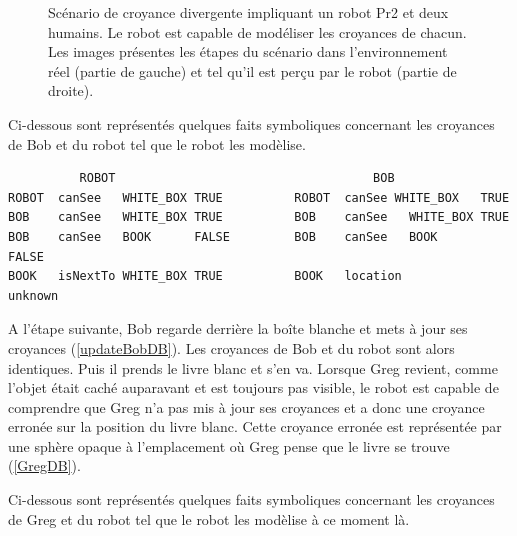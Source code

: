 \documentclass[a4paper,11pt,twoside]{StyleThese}
\begin{document}
\begin{figure}[ht!]
\begin{center}
 \end{center}
  \caption{Scénario de croyance divergente impliquant un robot Pr2 et deux humains. Le robot est capable de modéliser les croyances de chacun. Les images présentes les étapes du scénario dans l'environnement réel (partie de gauche) et tel qu'il est perçu par le robot (partie de droite).}
  \label{divB}
\end{figure}

Ci-dessous sont représentés quelques faits symboliques concernant les croyances de Bob et du robot tel que le robot les modèlise.

\begin{scriptsize}
\begin{verbatim}
          ROBOT                                    BOB
ROBOT  canSee   WHITE_BOX TRUE          ROBOT  canSee WHITE_BOX   TRUE    
BOB    canSee   WHITE_BOX TRUE          BOB    canSee   WHITE_BOX TRUE
BOB    canSee   BOOK      FALSE         BOB    canSee   BOOK      FALSE
BOOK   isNextTo WHITE_BOX TRUE          BOOK   location           unknown
\end{verbatim}
\end{scriptsize}

A l'étape suivante, Bob regarde derrière la boîte blanche et mets à jour ses croyances (\ref{updateBobDB}). Les croyances de Bob et du robot sont alors identiques.
Puis il prends le livre blanc et s'en va. Lorsque Greg revient, comme l'objet était caché auparavant et est toujours pas visible, le robot est capable de comprendre que Greg n'a pas mis à jour ses croyances et a donc une croyance erronée sur la position du livre blanc. Cette croyance erronée est représentée par une sphère opaque à l'emplacement où Greg pense que le livre se trouve (\ref{GregDB}).

Ci-dessous sont représentés quelques faits symboliques concernant les croyances de Greg et du robot tel que le robot les modèlise à ce moment là.
\end{document}
